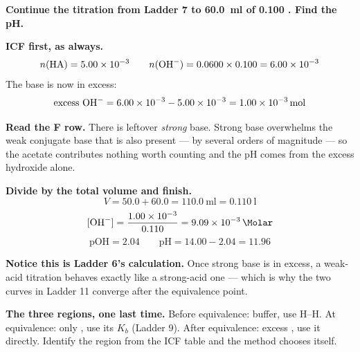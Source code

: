 \documentclass{apchem-worksheet}
\begin{document}
\begin{workedexample}
\textbf{Continue the titration from Ladder 7 to
\SI{60.0}{\milli\litre} of \SI{0.100}{\Molar} . Find the pH.}

\textbf{ICF first, as always.}
\[ n(\ce{HA}) = \num{5.00e-3}
   \qquad
   n(\ce{OH-}) = 0.0600 \times 0.100 = \num{6.00e-3} \]
The base is now in excess:
\[ \text{excess } \ce{OH-} = 6.00 \times 10^{-3} - 5.00 \times 10^{-3}
   = \SI{1.00e-3}{\mole} \]

\textbf{Read the F row.} There is leftover \emph{strong} base. Strong
base overwhelms the weak conjugate base  that is also present ---
by several orders of magnitude --- so the acetate contributes nothing
worth counting and the pH comes from the excess hydroxide alone.

\textbf{Divide by the total volume and finish.}
\[ V = 50.0 + 60.0 = \SI{110.0}{\milli\litre} = \SI{0.110}{\litre} \]
\[ [\ce{OH-}] = \frac{\num{1.00e-3}}{0.110}
   = \SI{9.09e-3}{\Molar} \]
\[ \text{pOH} = 2.04
   \qquad
   \text{pH} = 14.00 - 2.04 = \mathbf{11.96} \]

\textbf{Notice this is Ladder 6's calculation.} Once strong base is in
excess, a weak-acid titration behaves exactly like a strong-acid one ---
which is why the two curves in Ladder 11 converge after the equivalence
point.

\textbf{The three regions, one last time.} Before equivalence: buffer,
use H--H. At equivalence: only , use its $K_{b}$ (Ladder 9).
After equivalence: excess , use it directly. Identify the region
from the ICF table and the method chooses itself.
\end{workedexample}
\end{document}
